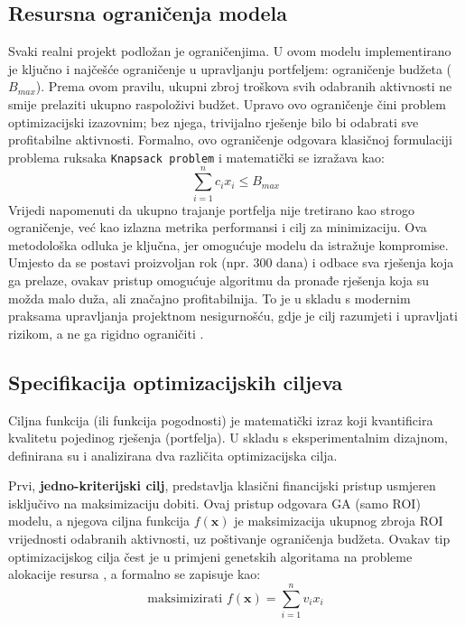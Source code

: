 \subsection{Resursna ograničenja modela}
Svaki realni projekt podložan je ograničenjima. U ovom modelu implementirano je ključno i najčešće ograničenje u upravljanju portfeljem: ograničenje budžeta ($B_{max}$). Prema ovom pravilu, ukupni zbroj troškova svih odabranih aktivnosti ne smije prelaziti ukupno raspoloživi budžet. Upravo ovo ograničenje čini problem optimizacijski izazovnim; bez njega, trivijalno rješenje bilo bi odabrati sve profitabilne aktivnosti. Formalno, ovo ograničenje odgovara klasičnoj formulaciji problema ruksaka \texttt{Knapsack problem}\cite{Kellerer2004} i matematički se izražava kao:
$$
\sum_{i=1}^n c_i x_i \leq B_{max}
$$
Vrijedi napomenuti da ukupno trajanje portfelja nije tretirano kao strogo ograničenje, već kao izlazna metrika performansi i cilj za minimizaciju. Ova metodološka odluka je ključna, jer omogućuje modelu da istražuje kompromise. Umjesto da se postavi proizvoljan rok (npr. 300 dana) i odbace sva rješenja koja ga prelaze, ovakav pristup omogućuje algoritmu da pronađe rješenja koja su možda malo duža, ali značajno profitabilnija. To je u skladu s modernim praksama upravljanja projektnom nesigurnošću, gdje je cilj razumjeti i upravljati rizikom, a ne ga rigidno ograničiti \cite{Smith2014}.

\subsection{Specifikacija optimizacijskih ciljeva}
Ciljna funkcija (ili funkcija pogodnosti) je matematički izraz koji kvantificira kvalitetu pojedinog rješenja (portfelja). U skladu s eksperimentalnim dizajnom, definirana su i analizirana dva različita optimizacijska cilja.

Prvi, \textbf{jedno-kriterijski cilj}, predstavlja klasični financijski pristup usmjeren isključivo na maksimizaciju dobiti. Ovaj pristup odgovara GA (samo ROI) modelu, a njegova ciljna funkcija $f(\mathbf{x})$ je maksimizacija ukupnog zbroja ROI vrijednosti odabranih aktivnosti, uz poštivanje ograničenja budžeta. Ovakav tip optimizacijskog cilja čest je u primjeni genetskih algoritama na probleme alokacije resursa \cite{Goldberg1989}, a formalno se zapisuje kao:
$$ \text{maksimizirati } f(\mathbf{x}) = \sum_{i=1}^n v_i x_i $$

